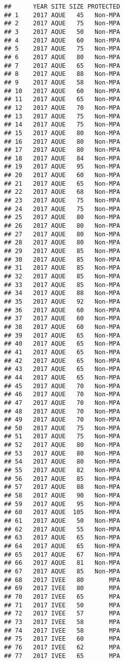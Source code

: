 \documentclass[]{article}
\begin{document}
\begin{verbatim}
##      YEAR SITE SIZE PROTECTED
## 1    2017 AQUE   45   Non-MPA
## 2    2017 AQUE   75   Non-MPA
## 3    2017 AQUE   50   Non-MPA
## 4    2017 AQUE   60   Non-MPA
## 5    2017 AQUE   75   Non-MPA
## 6    2017 AQUE   80   Non-MPA
## 7    2017 AQUE   65   Non-MPA
## 8    2017 AQUE   88   Non-MPA
## 9    2017 AQUE   58   Non-MPA
## 10   2017 AQUE   60   Non-MPA
## 11   2017 AQUE   65   Non-MPA
## 12   2017 AQUE   70   Non-MPA
## 13   2017 AQUE   75   Non-MPA
## 14   2017 AQUE   75   Non-MPA
## 15   2017 AQUE   80   Non-MPA
## 16   2017 AQUE   80   Non-MPA
## 17   2017 AQUE   80   Non-MPA
## 18   2017 AQUE   84   Non-MPA
## 19   2017 AQUE   95   Non-MPA
## 20   2017 AQUE   60   Non-MPA
## 21   2017 AQUE   65   Non-MPA
## 22   2017 AQUE   68   Non-MPA
## 23   2017 AQUE   75   Non-MPA
## 24   2017 AQUE   75   Non-MPA
## 25   2017 AQUE   80   Non-MPA
## 26   2017 AQUE   80   Non-MPA
## 27   2017 AQUE   80   Non-MPA
## 28   2017 AQUE   80   Non-MPA
## 29   2017 AQUE   85   Non-MPA
## 30   2017 AQUE   85   Non-MPA
## 31   2017 AQUE   85   Non-MPA
## 32   2017 AQUE   85   Non-MPA
## 33   2017 AQUE   85   Non-MPA
## 34   2017 AQUE   88   Non-MPA
## 35   2017 AQUE   92   Non-MPA
## 36   2017 AQUE   60   Non-MPA
## 37   2017 AQUE   60   Non-MPA
## 38   2017 AQUE   60   Non-MPA
## 39   2017 AQUE   65   Non-MPA
## 40   2017 AQUE   65   Non-MPA
## 41   2017 AQUE   65   Non-MPA
## 42   2017 AQUE   65   Non-MPA
## 43   2017 AQUE   65   Non-MPA
## 44   2017 AQUE   65   Non-MPA
## 45   2017 AQUE   70   Non-MPA
## 46   2017 AQUE   70   Non-MPA
## 47   2017 AQUE   70   Non-MPA
## 48   2017 AQUE   70   Non-MPA
## 49   2017 AQUE   70   Non-MPA
## 50   2017 AQUE   75   Non-MPA
## 51   2017 AQUE   75   Non-MPA
## 52   2017 AQUE   80   Non-MPA
## 53   2017 AQUE   80   Non-MPA
## 54   2017 AQUE   80   Non-MPA
## 55   2017 AQUE   82   Non-MPA
## 56   2017 AQUE   85   Non-MPA
## 57   2017 AQUE   88   Non-MPA
## 58   2017 AQUE   90   Non-MPA
## 59   2017 AQUE   95   Non-MPA
## 60   2017 AQUE  105   Non-MPA
## 61   2017 AQUE   50   Non-MPA
## 62   2017 AQUE   55   Non-MPA
## 63   2017 AQUE   65   Non-MPA
## 64   2017 AQUE   65   Non-MPA
## 65   2017 AQUE   67   Non-MPA
## 66   2017 AQUE   81   Non-MPA
## 67   2017 AQUE   85   Non-MPA
## 68   2017 IVEE   80       MPA
## 69   2017 IVEE   80       MPA
## 70   2017 IVEE   65       MPA
## 71   2017 IVEE   50       MPA
## 72   2017 IVEE   57       MPA
## 73   2017 IVEE   58       MPA
## 74   2017 IVEE   58       MPA
## 75   2017 IVEE   60       MPA
## 76   2017 IVEE   62       MPA
## 77   2017 IVEE   65       MPA

\end{verbatim}
\end{document}
